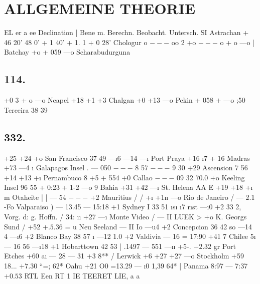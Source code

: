 \documentclass[12pt,a4paper]{article}
\begin{document}
\newpage


\section*{ALLGEMEINE THEORIE}
EL er a ee Declination | Bene m. Berechn. Beobacht. Untersch. SI Astrachan + 46\textdegree{} 20' 48\textdegree{} 0' + 1\textdegree{} 40' + 1\textdegree{}. 1 + 0\textdegree{} 28' Chologur o
$---$
oo 2\guillemotright{} +o%
$---$
o + o ---o | Batchay +o + 059 ---o Scharabudurguna

\subsection*{114.}
+0 3 + o ---o Neapel +18 +1 +3 Chalgan +0 +13 ---o Pekin + 058
$+$
---o ;50 Terceira 38 39

\subsection*{332.}
+25 +24 +o San Francisco 37 49 ---\i{}6 ---14 ---\i{} Port Praya +16 \i{}7 + 16 Madras +73 ---4 \i{} Galapagos Insel . --- 050
$---$
8 57
$---$
9 30 +29 Ascension 7 56 +14 +13 +\i{} Pernambuco 8\textdegree{} +5 + 554 +0 Callao
$---$
09 32 70.0 +o Keeling Insel 96 55 + 0:23 + 1-2 ---o 9 Bahia +31 +42 ---\i{} St. Helena AA E +19 +18 +\i{} m Otaheite | | --- 54
$---$
+2 Mauritius / / +\i{} +1\i{}\i{} ---o Rio de Janeiro / --- 2.1 -Fo Valparaiso ) --- 13.45 --- 15:18 +1 Sydney I 33 51 \i{}s\i{} \i{}7 r\i{}st ---\i{}0 +2 33 2, Vorg. d: g. Hoffn. / 34: \i{}\i{} +27 ---\i{} Monte Video / --- II LUEK > +o K. Georgs Sund / +52
$+. 5.36$
= u Neu Seeland --- II Io ---u4 +2 Concepcion 36 42 so ---14 4 ---\i{}6 +2 Blanco Bay 38 57 \i{} ---12 1.0 +2 Valdivia --- 16 = 17:90 +41 7 Chilee 5\i{} --- 16 56 ---\i{}18 +1 Hobarttown 42 53 | .1497 --- 551 ---\i{}\i{} +5-.%
$+ 2.32$
gr Port Etches +60 a\i{} --- 28 --- 31 +3 8** / Lerwick +6 +27 +27 ---o Stockholm +59 18...%
$+ 7.30$
``=; 62* Oahu +21 O0 =13.29 --- \i{}0 1,39 64* | Panama 8:97 --- 7:37
$+0.53$
RTL Een RT 1 IE TEERET LIE, a a
\end{document}
